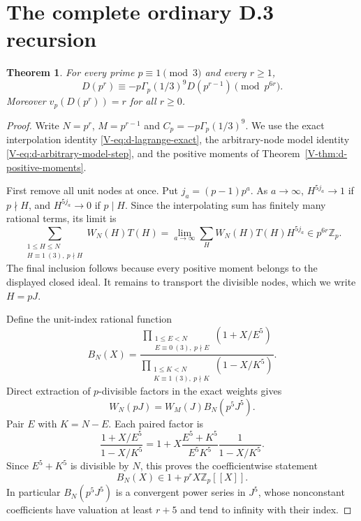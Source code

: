 \documentclass[11pt,letterpaper]{article}
\newtheorem{theorem}{Theorem}[section]
\numberwithin{equation}{section}
\begin{document}
\section{The complete ordinary D.3 recursion}\label{loc-V-6}
\label{V-sec:d-ordinary-complete}
\begin{theorem}\label{V-thm:d-ordinary-complete}
For every prime $p\equiv1\pmod3$ and every $r\ge1$,
\[
 \boxed{D(p^r)\equiv-p\Gamma_p(1/3)^9D(p^{r-1})\pmod{p^{6r}}.}
\]
Moreover $v_p(D(p^r))=r$ for all $r\ge0$.
\end{theorem}
\begin{proof}
Write $N=p^r$, $M=p^{r-1}$ and $C_p=-p\Gamma_p(1/3)^9$.
We use the exact interpolation identity \eqref{V-eq:d-lagrange-exact},
the arbitrary-node model identity \eqref{V-eq:d-arbitrary-model-step},
and the positive moments of Theorem~\ref{V-thm:d-positive-moments}.

First remove all unit nodes at once. Put $j_a=(p-1)p^a$.
As $a\to\infty$, $H^{5j_a}\to1$ if $p\nmid H$, and
$H^{5j_a}\to0$ if $p\mid H$. Since the interpolating sum has finitely
many rational terms, its limit is
\[
 \sum_{\substack{1\le H\le N\\H\equiv1\ (3),\ p\nmid H}}
 W_N(H)T(H)
 =\lim_{a\to\infty}\sum_H W_N(H)T(H)H^{5j_a}
 \in p^{6r}\mathbb Z_p.
\]
The final inclusion follows because every positive moment belongs to
the displayed closed ideal. It remains to transport the divisible
nodes, which we write $H=pJ$.

Define the unit-index rational function
\[
 B_N(X)=
 \frac{\prod_{\substack{1\le E<N\\E\equiv0\ (3),\ p\nmid E}}(1+X/E^5)}
 {\prod_{\substack{1\le K<N\\K\equiv1\ (3),\ p\nmid K}}(1-X/K^5)}.
\]
Direct extraction of $p$-divisible factors in the exact weights gives
\[
 W_N(pJ)=W_M(J)B_N(p^5J^5).
\]
Pair $E$ with $K=N-E$. Each paired factor is
\[
 \frac{1+X/E^5}{1-X/K^5}
 =1+X\frac{E^5+K^5}{E^5K^5}\frac1{1-X/K^5}.
\]
Since $E^5+K^5$ is divisible by $N$, this proves the coefficientwise
statement
\begin{equation}\label{V-eq:d-weight-series}
 B_N(X)\in1+p^rX\mathbb Z_p[[X]].
\end{equation}
In particular $B_N(p^5J^5)$ is a convergent power series in $J^5$,
whose nonconstant coefficients have valuation at least $r+5$ and
tend to infinity with their index.


\end{proof}
\end{document}
